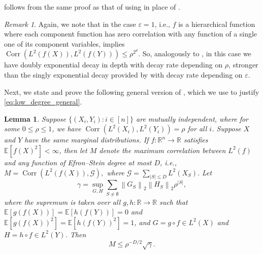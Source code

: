 \documentclass[12pt,letterpaper]{amsart}
\def\E{\mathbb{E}}
\def\R{\mathbb{R}}
\def\Corr{\operatorname{Corr}}
\newcommand{\mc}[1]{\mathcal{#1}}
\newcommand{\norm}[1]{\left\lVert#1\right\rVert}
\newcommand{\abs}[1]{\left\lvert#1\right\rvert}
\newcommand{\1}[1]{1_{\left\{#1\right\}}}
\newtheorem{lemma}[theorem]{Lemma}
\theoremstyle{definition}
\theoremstyle{remark}
\newtheorem{remark}[theorem]{Remark}
\begin{document}
 follows from the same proof as that of  using  in place of .
\begin{remark}\label{remark:nonseparable_epsilon1}
    Again, we note that in the case $\varepsilon=1$, i.e., $f$ is a hierarchical function where each component function has zero correlation with any function of a single one of its component variables,  implies $\Corr(L^2(f(X)),L^2(f(Y)))\leq\rho^{2^d}$.
    So, analogously to , in this case we have doubly exponential decay in depth with decay rate depending on $\rho$, stronger than the singly exponential decay provided by  with decay rate depending on $\varepsilon$.
\end{remark}
Next, we state and prove the following general version of , which we use to justify \eqref{eq:low_degree_general}.
\begin{lemma}\label{lemma:low_degree_general}
    Suppose $\{(X_i,Y_i):i\in[n]\}$ are mutually independent, where for some $0\leq\rho\leq1$, we have $\Corr(L^2(X_i),L^2(Y_i))=\rho$ for all $i$.
    Suppose $X$ and $Y$ have the same marginal distributions.
    If $f:\R^n\to\R$ satisfies $\E[f(X)^2]<\infty$, then let $M$ denote the maximum correlation between $L^2(f)$ and any function of Efron--Stein degree at most $D$, i.e.,
    $M = \Corr(L^2(f(X)),\mc G),$
    where
    $\mc G = \sum_{\abs{S}\leq D} L^2(X_S).$
    Let
    \[ \gamma = \sup_{G,H}\sum_{S\neq\emptyset}\norm{G_S}_2\norm{H_S}_2\rho^{\abs{S}}, \]
    where the supremum is taken over all $g,h:\R\to\R$ such that $\E[g(f(X))]=\E[h(f(Y))]=0$ and $\E[g(f(X))^2]=\E[h(f(Y))^2]=1$, and $G=g\circ f \in L^2(X)$ and $H=h\circ f\in L^2(Y)$.
    Then
    \[ M \leq \rho^{-D/2}\sqrt{\gamma}. \]
\end{lemma}
\end{document}
